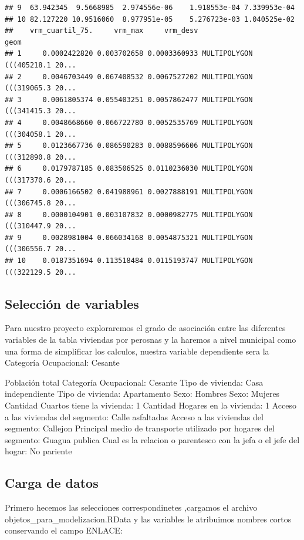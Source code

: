 \documentclass[11pt,]{article}
\begin{document}
\begin{verbatim}
## 9  63.942345  9.5668985  2.974556e-06    1.918553e-04 7.339953e-04
## 10 82.127220 10.9516060  8.977951e-05    5.276723e-03 1.040525e-02
##    vrm_cuartil_75.     vrm_max     vrm_desv                           geom
## 1     0.0002422820 0.003702658 0.0003360933 MULTIPOLYGON (((405218.1 20...
## 2     0.0046703449 0.067408532 0.0067527202 MULTIPOLYGON (((319065.3 20...
## 3     0.0061805374 0.055403251 0.0057862477 MULTIPOLYGON (((341415.3 20...
## 4     0.0048668660 0.066722780 0.0052535769 MULTIPOLYGON (((304058.1 20...
## 5     0.0123667736 0.086590283 0.0088596606 MULTIPOLYGON (((312890.8 20...
## 6     0.0179787185 0.083506525 0.0110236030 MULTIPOLYGON (((317370.6 20...
## 7     0.0006166502 0.041988961 0.0027888191 MULTIPOLYGON (((306745.8 20...
## 8     0.0000104901 0.003107832 0.0000982775 MULTIPOLYGON (((310447.9 20...
## 9     0.0028981004 0.066034168 0.0054875321 MULTIPOLYGON (((306556.7 20...
## 10    0.0187351694 0.113518484 0.0115193747 MULTIPOLYGON (((322129.5 20...
\end{verbatim}

\subsection{Selección de variables}\label{selecciuxf3n-de-variables}

Para nuestro proyecto exploraremos el grado de asociación entre las
diferentes variables de la tabla viviendas por perosnas y la haremos a
nivel municipal como una forma de simplificar los calculos, nuestra
variable dependiente sera la Categoría Ocupacional: Cesante

Población total Categoría Ocupacional: Cesante Tipo de vivienda: Casa
independiente Tipo de vivienda: Apartamento Sexo: Hombres Sexo: Mujeres
Cantidad Cuartos tiene la vivienda: 1 Cantidad Hogares en la vivienda: 1
Acceso a las viviendas del segmento: Calle asfaltadas Acceso a las
viviendas del segmento: Callejon Principal medio de transporte utilizado
por hogares del segmento: Guagua publica Cual es la relacion o
parentesco con la jefa o el jefe del hogar: No pariente

\subsection{Carga de datos}\label{carga-de-datos}

Primero hecemos las selecciones correspondinetes ,cargamos el archivo
objetos\_para\_modelizacion.RData y las variables le atribuimos nombres
cortos conservando el campo ENLACE:
\end{document}
